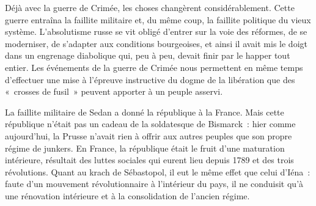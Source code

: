\documentclass[french,twoside]{book} %
\begin{document}
Déjà avec la guerre de Crimée, les choses changèrent considérablement. Cette guerre entraîna la faillite militaire et, du même coup, la faillite politique du vieux système. L'absolutisme russe se vit obligé d’entrer sur la voie des réformes, de se moderniser, de s’adapter aux conditions bourgeoises, et ainsi il avait mis le doigt dans un engrenage diabolique qui, peu à peu, devait finir par le happer tout entier. Les événements de la guerre de Crimée nous permettent en même temps d’effectuer une mise à l’épreuve instructive du dogme de la libération que des « crosses de fusil » peuvent apporter à un peuple asservi.\par
  La faillite militaire de Sedan a donné la république à la France. Mais cette république n’était pas un cadeau de la soldatesque de Bismarck : hier comme aujourd’hui, la Prusse n’avait rien à offrir aux autres peuples que son propre régime de junkers. En France, la république était le fruit d’une maturation intérieure, résultait des luttes sociales qui eurent lieu depuis 1789 et des trois révolutions. Quant au krach de Sébastopol, il eut le même effet que celui d’Iéna : faute d’un mouvement révolutionnaire à l’intérieur du pays, il ne conduisit qu’à une rénovation intérieure et à la consolidation de l’ancien régime.\par
\end{document}
